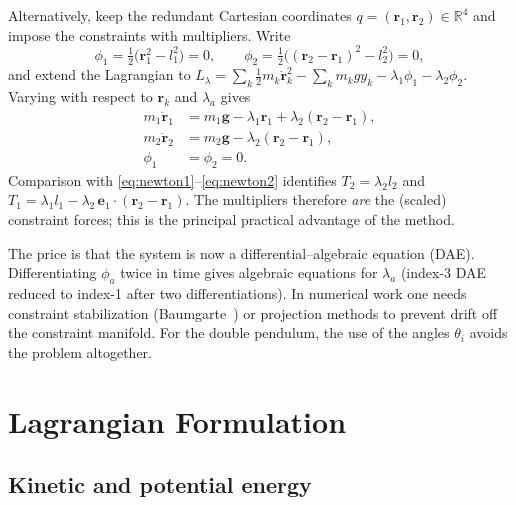 \documentclass[11pt,a4paper]{book}
\theoremstyle{definition}
\theoremstyle{remark}
\begin{document}
Alternatively, keep the redundant Cartesian coordinates $q=(\bm r_1,\bm r_2)\in\mathbb R^4$ and impose the constraints
with multipliers. Write
\begin{equation}
  \phi_1=\tfrac12\big(\bm r_1^2-l_1^2\big)=0,\qquad
  \phi_2=\tfrac12\big((\bm r_2-\bm r_1)^2-l_2^2\big)=0 ,
\end{equation}
and extend the Lagrangian to $L_\lambda=\sum_k\tfrac12 m_k\dot{\bm r}_k^2-\sum_k m_kgy_k-\lambda_1\phi_1-\lambda_2\phi_2$.
Varying with respect to $\bm r_k$ and $\lambda_a$ gives
\begin{align}
  m_1\ddot{\bm r}_1 &= m_1\bm g - \lambda_1\bm r_1 + \lambda_2(\bm r_2-\bm r_1),\\
  m_2\ddot{\bm r}_2 &= m_2\bm g - \lambda_2(\bm r_2-\bm r_1),\\
  \phi_1&=\phi_2=0 .
\end{align}
Comparison with \eqref{eq:newton1}--\eqref{eq:newton2} identifies $T_2=\lambda_2 l_2$ and
$T_1=\lambda_1 l_1 - \lambda_2\,\bm e_1\!\cdot\!(\bm r_2-\bm r_1)$. The multipliers therefore \emph{are} the
(scaled) constraint forces; this is the principal practical advantage of the method.

The price is that the system is now a differential--algebraic equation (DAE). Differentiating $\phi_a$ twice
in time gives algebraic equations for $\lambda_a$ (index-3 DAE reduced to index-1 after two differentiations). In
numerical work one needs constraint stabilization (Baumgarte~\cite{baumgarte}) or projection methods to prevent drift off the
constraint manifold. For the double pendulum, the use of the angles $\theta_i$ avoids the problem altogether.

\section{Lagrangian Formulation}
\label{sec:lagrange}

\subsection{Kinetic and potential energy}
\end{document}
